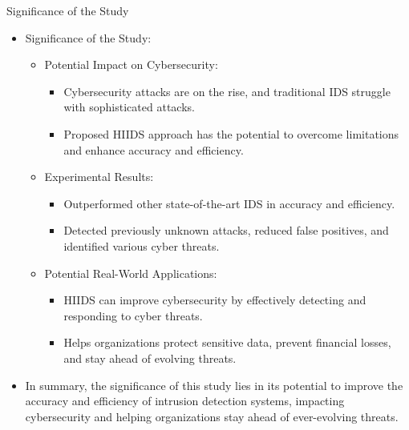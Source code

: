 \documentclass{beamer}
\begin{document}
\begin{frame}{Significance of the Study}

  \begin{itemize}
    \item Significance of the Study:
      \begin{itemize}
        \item Potential Impact on Cybersecurity:
          \begin{itemize}
            \item Cybersecurity attacks are on the rise, and traditional IDS struggle with sophisticated attacks.
            \item Proposed HIIDS approach has the potential to overcome limitations and enhance accuracy and efficiency.
          \end{itemize}
        \item Experimental Results:
          \begin{itemize}
            \item Outperformed other state-of-the-art IDS in accuracy and efficiency.
            \item Detected previously unknown attacks, reduced false positives, and identified various cyber threats.
          \end{itemize}
        \item Potential Real-World Applications:
          \begin{itemize}
            \item HIIDS can improve cybersecurity by effectively detecting and responding to cyber threats.
            \item Helps organizations protect sensitive data, prevent financial losses, and stay ahead of evolving threats.
          \end{itemize}
      \end{itemize}
    \item In summary, the significance of this study lies in its potential to improve the accuracy and efficiency of intrusion detection systems, impacting cybersecurity and helping organizations stay ahead of ever-evolving threats.
  \end{itemize}
\end{frame}
\end{document}
